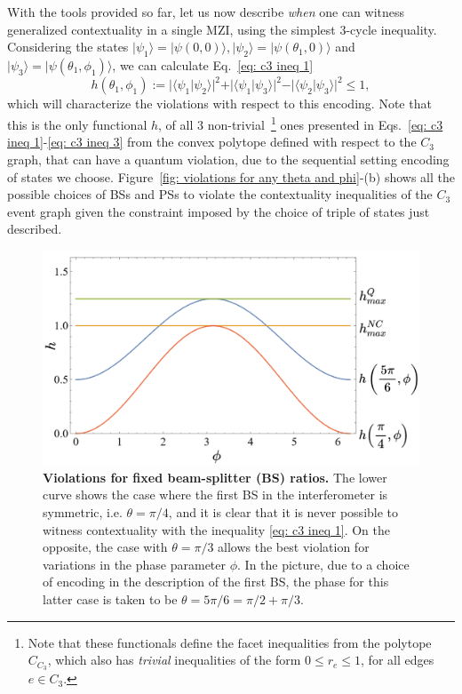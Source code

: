 \documentclass[letterpaper,onecolumn,12pt,accepted=2024-01-17]{article}
\begin{document}
With the tools provided so far, let us now describe \textit{when} one can witness generalized contextuality in a single MZI, using the simplest $3$-cycle inequality. {Considering the states $\vert \psi_1 \rangle = \vert \psi(0,0)\rangle, \vert \psi_2 \rangle = \vert \psi(\theta_1,0)\rangle$ and $\vert \psi_3 \rangle = \vert \psi(\theta_1,\phi_1)\rangle$,} we can calculate { Eq.~\eqref{eq: c3 ineq 1} 
\begin{equation}\label{eq: c3 functional for standard MZI}
    h(\theta_1,\phi_1) := \vert \langle \psi_1 \vert \psi_2 \rangle \vert^2 + \vert \langle \psi_1 \vert \psi_3 \rangle\vert^2 - \vert \langle \psi_2 \vert \psi_3 \rangle\vert^2 \leq 1,
\end{equation}}
which will characterize the violations with respect to this encoding. Note that this is the only functional $h$, of all $3$ non-trivial~\footnote{Note that these functionals define the facet inequalities from the polytope $C_{C_3}$, which also has \textit{trivial} inequalities of the form $0 \leq r_e \leq 1$, for all edges $e \in C_3$. } ones { presented in Eqs.~\eqref{eq: c3 ineq 1}-\eqref{eq: c3 ineq 3} from the convex polytope defined with respect to } the $C_3$ graph, that can have a quantum violation, due to the sequential setting encoding of states we choose. Figure~\ref{fig: violations for any theta and phi}-(b) shows all the possible choices of BSs and PSs to violate the contextuality inequalities of the $C_3$ event graph given the constraint imposed by the choice of triple of states just described. 
\begin{figure}[tb]
    \centering
    \includegraphics[width=\columnwidth]{Acc_Figures/sequentialBSviolations.png}
    \caption{\textbf{Violations for fixed beam-splitter (BS) ratios.} The lower curve shows the case where the first BS in the interferometer is symmetric, i.e. $\theta=\pi/4$, and it is clear that it is never possible to witness contextuality with the inequality \eqref{eq: c3 ineq 1}. On the opposite, the case with $\theta=\pi/3$ allows the best violation for variations in the phase parameter $\phi$. In the picture, due to a choice of encoding in the description of the first BS, the phase for this latter case is taken to be {$\theta=5\pi/6=\pi/2+\pi/3$}.}
    \label{fig:BS fixed violations}
\end{figure}
\end{document}
